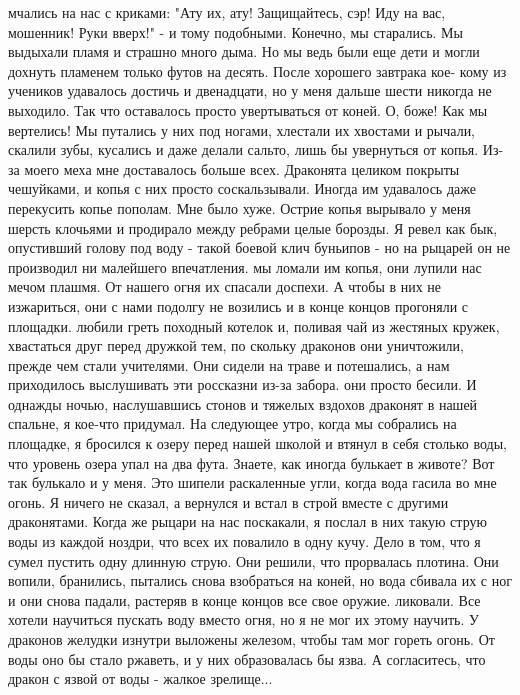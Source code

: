 мчались на нас с криками: "Ату их, ату! Защищайтесь, сэр! Иду на вас, 
мошенник! Руки вверх!" - и тому подобными. Конечно, мы старались. Мы 
выдыхали пламя и страшно много дыма. Но мы ведь были еще дети и могли 
дохнуть пламенем только футов на десять. После хорошего завтрака кое-
кому из учеников удавалось достичь и двенадцати, но у меня дальше 
шести никогда не выходило. Так что оставалось просто увертываться от 
коней. О, боже! Как мы вертелись! Мы путались у них под ногами, 
хлестали их хвостами и рычали, скалили зубы, кусались и даже делали 
сальто, лишь бы увернуться от копья. Из-за моего меха мне доставалось 
больше всех. Драконята целиком покрыты чешуйками, и копья с них просто 
соскальзывали. Иногда им удавалось даже перекусить копье пополам. Мне 
было хуже. Острие копья вырывало у меня шерсть клочьями и продирало 
между ребрами целые борозды. Я ревел как бык, опустивший голову под 
воду - такой боевой клич буньипов - но на рыцарей он не производил ни 
малейшего впечатления.
 мы ломали им копья, они лупили нас мечом плашмя. От нашего 
огня их спасали доспехи. А чтобы в них не изжариться, они с нами 
подолгу не возились и в конце концов прогоняли с площадки.
 любили греть походный котелок и, поливая чай из жестяных 
кружек, хвастаться друг перед дружкой тем, по скольку драконов они 
уничтожили, прежде чем стали учителями. Они сидели на траве и 
потешались, а нам приходилось выслушивать эти россказни из-за забора.
 они просто бесили. И однажды ночью, наслушавшись стонов и 
тяжелых вздохов драконят в нашей спальне, я кое-что придумал. На 
следующее утро, когда мы собрались на площадке, я бросился к озеру 
перед нашей школой и втянул в себя столько воды, что уровень озера 
упал на два фута. Знаете, как иногда булькает в животе? Вот так 
булькало и у меня. Это шипели раскаленные угли, когда вода гасила во 
мне огонь. Я ничего не сказал, а вернулся и встал в строй вместе с 
другими драконятами. Когда же рыцари на нас поскакали, я послал в них 
такую струю воды из каждой ноздри, что всех их повалило в одну кучу. 
Дело в том, что я сумел пустить одну длинную струю. Они решили, что 
прорвалась плотина. Они вопили, бранились, пытались снова взобраться 
на коней, но вода сбивала их с ног и они снова падали, растеряв в 
конце концов все свое оружие.
 ликовали. Все хотели научиться пускать воду вместо огня, 
но я не мог их этому научить. У драконов желудки изнутри выложены 
железом, чтобы там мог гореть огонь. От воды оно бы стало ржаветь, и у 
них образовалась бы язва. А согласитесь, что дракон с язвой от воды - 
жалкое зрелище...
